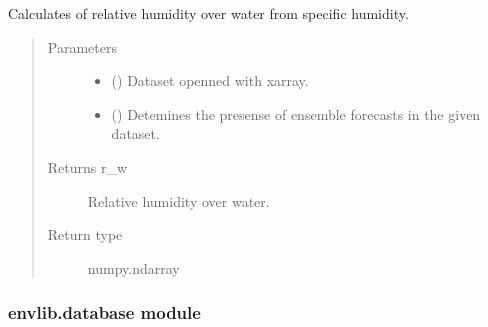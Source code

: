 \documentclass[a4paper,11pt,english]{sphinxmanual}
\begin{document}
\begin{fulllineitems}
\label{\detokenize{envlib:envlib.contrail.get_rw_from_specific_hum}}
Calculates of relative humidity over water from specific humidity.
\begin{quote}\begin{description}
\item[{Parameters}] \leavevmode\begin{itemize}
\item {} 
 () \textendash{} Dataset openned with xarray.

\item {} 
 () \textendash{} Detemines the presense of ensemble forecasts in the given dataset.

\end{itemize}

\item[{Returns r\_w}] \leavevmode
Relative humidity over water.

\item[{Return type}] \leavevmode
numpy.ndarray

\end{description}\end{quote}

\end{fulllineitems}


\begin{fulllineitems}
\label{\detokenize{envlib:envlib.contrail.potential_con_cir_cov}}
\end{fulllineitems}



\subsubsection{envlib.database module}
\label{\detokenize{envlib:module-envlib.database}}\label{\detokenize{envlib:envlib-database-module}}
\end{document}
